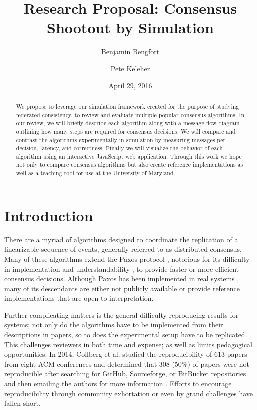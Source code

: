 \documentclass[11pt,letterpaper]{article}
\title{Research Proposal: Consensus Shootout by Simulation}
\date{April 29, 2016}
\author[ ]{Benjamin Bengfort}
\author[ ]{Pete Keleher}
\affil[ ]{Department of Computer Science}
\affil[ ]{University of Maryland}
\affil[ ]{\textit{\{bengfort,keleher\}@cs.umd.edu}}
\begin{document}
\maketitle

\begin{abstract}
We propose to leverage our simulation framework created for the purpose of studying federated consistency, to review and evaluate multiple popular consensus algorithms. In our review, we will briefly describe each algorithm along with a message flow diagram outlining how many steps are required for consensus decisions. We will compare and contrast the algorithms experimentally in simulation by measuring messages per decision, latency, and correctness. Finally we will visualize the behavior of each algorithm using an interactive JavaScript web application. Through this work we hope not only to compare consensus algorithms but also create reference implementations as well as a teaching tool for use at the University of Maryland.
\end{abstract}

\section*{Introduction}

There are a myriad of algorithms designed to coordinate the replication of a linearizable sequence of events, generally referred to as distributed consensus. Many of these algorithms extend the Paxos protocol \cite{lamport_paxos_2001}, notorious for its difficulty in implementation \cite{chandra_paxos_2007} and understandability \cite{ongaro_search_2014}, to provide faster or more efficient consensus decisions. Although Paxos has been implemented in real systems \cite{bolosky_paxos_2011,burrows_chubby_2006}, many of its descendants are either not publicly available or provide reference implementations that are open to interpretation.

Further complicating matters is the general difficulty reproducing results for systems; not only do the algorithms have to be implemented from their descriptions in papers, so to does the experimental setup have to be replicated. This challenges reviewers in both time and expense; as well as limits pedagogical opportunities. In 2014, Collberg et al. studied the reproducibility of 613 papers from eight ACM conferences and determined that 308 (50\%) of papers were not reproducible after searching for GitHub, Sourceforge, or BitBucket repositories and then emailing the authors for more information \cite{collberg_measuring_2014}. Efforts to encourage reproducibility through community exhortation \cite{kovacevic_how_2007} or even by grand challenges \cite{van_gorp_share_2011} have fallen short.
\end{document}
